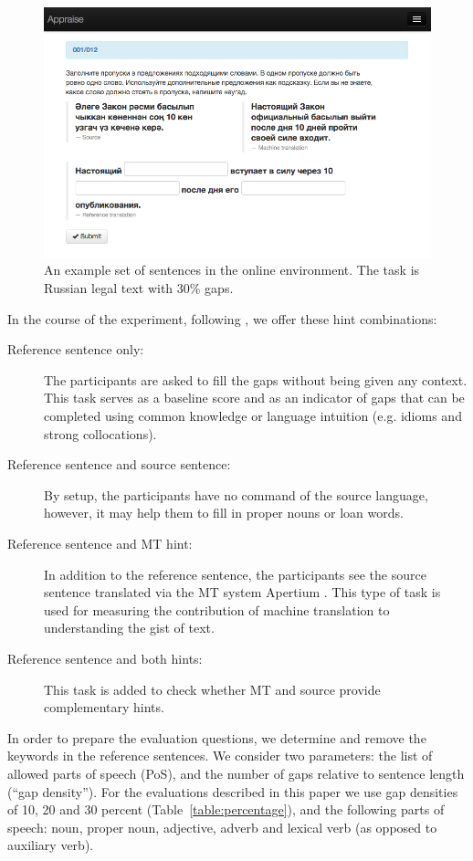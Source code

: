 \documentclass[11pt]{article}
\begin{document}
\begin{figure}
  \centering
\includegraphics[width=1.0\textwidth,resolution=144]{appraise-scr}
 \caption{An example set of sentences in the online environment. The task is Russian legal text with 30\% gaps.}
\label{figure:screenshot}
\end{figure}

In the course of the experiment, following \cite{oregan13}, we offer these hint combinations:
\begin{description}
\item[Reference sentence only:] The participants are asked to fill the gaps without being given
any context. This task serves as a baseline score and as an indicator of gaps
that can be completed using common knowledge or language intuition (e.g.
idioms and strong collocations).
\item[Reference sentence and source sentence:] By setup, the
participants have no command of the source language, however, it may help them to fill
in proper nouns or loan words.
\item[Reference sentence and MT hint:] In addition to the reference sentence, the
participants see the source sentence translated via the MT system Apertium \citep{forcada11}. This type of task is
used for measuring the contribution of machine translation to understanding the
gist of text.
\item[Reference sentence and both hints:] This task is
added to check whether MT and source provide complementary hints.
\end{description}

In order to prepare the evaluation questions, we determine and remove the keywords in the 
reference sentences. We consider two parameters: the list of allowed parts of speech (PoS), and the 
number of gaps relative to sentence length (``gap density''). For the evaluations described in 
this paper we use gap densities of 10, 20 and 30 percent (Table~\ref{table:percentage}), and the following parts of speech: noun, 
proper noun, adjective, adverb and lexical verb (as opposed to auxiliary verb).
\end{document}
